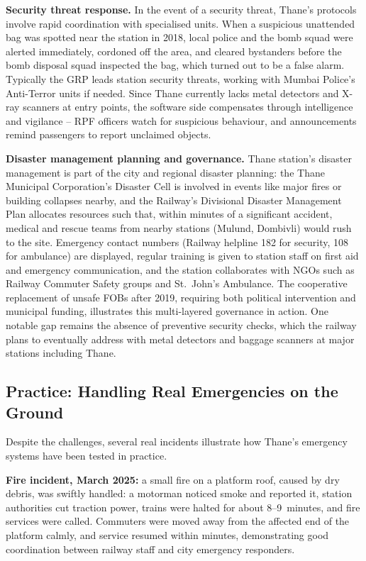 \documentclass[11pt]{article}
\begin{document}
\textbf{Security threat response.} In the event of a security threat, Thane's protocols involve
rapid coordination with specialised units. When a suspicious unattended bag was spotted near the
station in 2018, local police and the bomb squad were alerted immediately, cordoned off the
area, and cleared bystanders before the bomb disposal squad inspected the bag, which turned out
to be a false alarm. Typically the GRP leads station security threats, working with Mumbai
Police's Anti-Terror units if needed. Since Thane currently lacks metal detectors and X-ray
scanners at entry points, the software side compensates through intelligence and vigilance --
RPF officers watch for suspicious behaviour, and announcements remind passengers to report
unclaimed objects.

\textbf{Disaster management planning and governance.} Thane station's disaster management is
part of the city and regional disaster planning: the Thane Municipal Corporation's Disaster Cell
is involved in events like major fires or building collapses nearby, and the Railway's Divisional
Disaster Management Plan allocates resources such that, within minutes of a significant accident,
medical and rescue teams from nearby stations (Mulund, Dombivli) would rush to the site.
Emergency contact numbers (Railway helpline 182 for security, 108 for ambulance) are displayed,
regular training is given to station staff on first aid and emergency communication, and the
station collaborates with NGOs such as Railway Commuter Safety groups and St.\ John's Ambulance.
The cooperative replacement of unsafe FOBs after 2019, requiring both political intervention
and municipal funding, illustrates this multi-layered governance in action. One notable gap
remains the absence of preventive security checks, which the railway plans to eventually address
with metal detectors and baggage scanners at major stations including Thane.

\subsection{Practice: Handling Real Emergencies on the Ground}

Despite the challenges, several real incidents illustrate how Thane's emergency systems have
been tested in practice.

\textbf{Fire incident, March 2025:} a small fire on a platform roof, caused by dry debris, was
swiftly handled: a motorman noticed smoke and reported it, station authorities cut traction
power, trains were halted for about 8--9~minutes, and fire services were called. Commuters were
moved away from the affected end of the platform calmly, and service resumed within minutes,
demonstrating good coordination between railway staff and city emergency responders.
\end{document}
